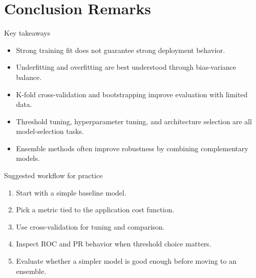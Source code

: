 \documentclass[12pt]{beamer}
\begin{document}
\section{Conclusion Remarks}

\begin{frame}{Key takeaways}
  \begin{itemize}
    \item Strong training fit does not guarantee strong deployment behavior.
    \item Underfitting and overfitting are best understood through bias-variance balance.
    \item K-fold cross-validation and bootstrapping improve evaluation with limited data.
    \item Threshold tuning, hyperparameter tuning, and architecture selection are all model-selection tasks.
    \item Ensemble methods often improve robustness by combining complementary models.
  \end{itemize}
\end{frame}

\begin{frame}{Suggested workflow for practice}
  \begin{enumerate}
    \item Start with a simple baseline model.
    \item Pick a metric tied to the application cost function.
    \item Use cross-validation for tuning and comparison.
    \item Inspect ROC and PR behavior when threshold choice matters.
    \item Evaluate whether a simpler model is good enough before moving to an ensemble.
  \end{enumerate}
\end{frame}
\end{document}
